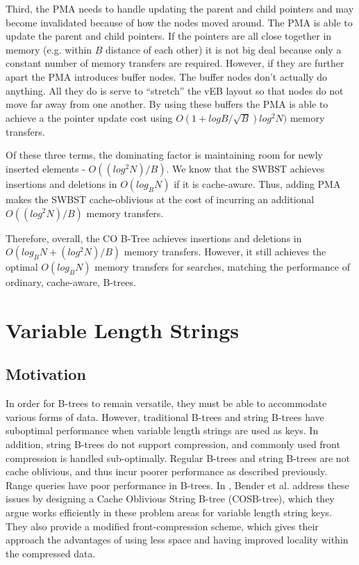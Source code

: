 \documentclass{style}
\begin{document}
Third, the PMA needs to handle updating the parent and child pointers and may
become invalidated because of how the nodes moved around. The PMA is able to
update the parent and child pointers. If the pointers are all close together
in memory (e.g. within $B$ distance of each other) it is not big deal because
only a constant number of memory transfers are required. However, if they are
further apart the PMA introduces buffer nodes. The buffer nodes don't actually
do anything. All they do is serve to ``stretch'' the vEB layout so that nodes
do not move far away from one another. By using these buffers the PMA is able
to achieve a the pointer update cost using $O(1+ logB / \sqrt{B}) log^2 N)$
memory transfers.

Of these three terms, the dominating factor is maintaining room for newly
inserted elements - $O((log^2N)/B)$. We know that the SWBST achieves insertions and
deletions in $O(log_B N)$ if it is cache-aware. Thus, adding PMA makes
the SWBST cache-oblivious at the cost of incurring an additional $O((log^2N)/B)$ memory
transfers.

Therefore, overall, the CO B-Tree achieves insertions and deletions in 
$O(log_B N + (log^2N)/B)$ memory transfers. However, it still achieves the optimal
$O(log_B N)$ memory transfers for searches, matching the performance of
ordinary, cache-aware, B-trees.

\section{Variable Length Strings}

\subsection{Motivation}
In order for B-trees to remain versatile, they must be able to accommodate various forms of data. However, traditional B-trees and string B-trees have suboptimal performance when variable length strings are used as keys. In addition, string B-trees do not support compression, and commonly used front compression is handled sub-optimally. Regular B-trees and string B-trees are not cache oblivious, and thus incur poorer performance as described previously. Range queries have poor performance in B-trees. In \cite{BenderFaKu06}, Bender et al. address these issues by designing a Cache Oblivious String B-tree (COSB-tree), which they argue works efficiently in these problem areas for variable length string keys. They also provide a modified front-compression scheme, which gives their approach the advantages of using less space and having improved locality within the compressed data.
\end{document}
